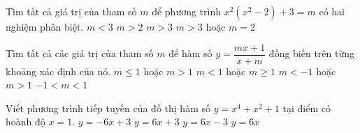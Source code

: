 \begin{ex}%
Tìm tất cả giá trị của tham số $m$ để phương trình $x^2(x^2-2)+3=m$ có hai nghiệm phân biệt.
\choice 
{$m<3$}
{$m>2$}
{$m>3$}
{\True $m>3$ hoặc $m=2$}
\end{ex}
\begin{ex}%
Tìm tất cả các giá trị của tham số $m$ để hàm số $y=\dfrac{mx+1}{x+m}$ đồng biến trên từng khoảng xác định của nó.
\choice 
{$m\leq 1$ hoặc $m>1$}
{$m< 1$ hoặc $m\geq 1$}
{\True $m< -1$ hoặc $m>1$}
{$-1<m<1$}
\end{ex}
\begin{ex}%
Viết phương trình tiếp tuyến của đồ thị hàm số $y=x^4+x^2+1$ tại điểm có hoành độ $x=1$.
\choice 
{$y=-6x+3$}
{\True $y=6x+3$}
{$y=6x-3$}
{$y=6x$}
\loigiai{

}
\end{ex}

